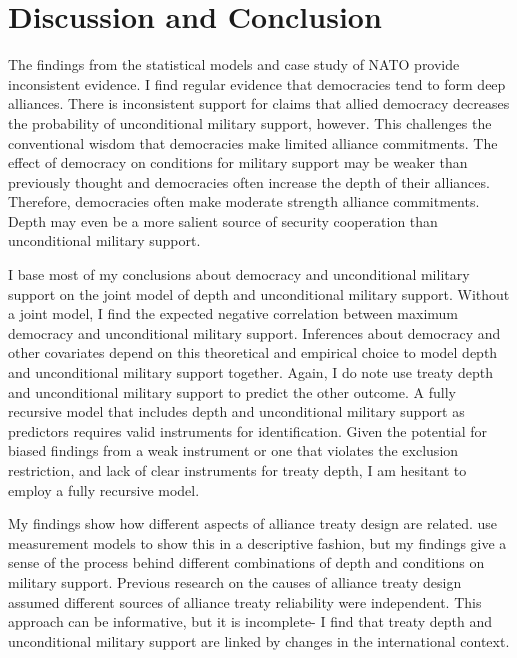 \documentclass[12pt]{article}
\begin{document}
\section{Discussion and Conclusion}


The findings from the statistical models and case study of NATO provide inconsistent evidence. 
I find regular evidence that democracies tend to form deep alliances.
There is inconsistent support for claims that allied democracy decreases the probability of unconditional military support, however. 
This challenges the conventional wisdom that democracies make limited alliance commitments.
The effect of democracy on conditions for military support may be weaker than previously thought and democracies often increase the depth of their alliances. 
Therefore, democracies often make moderate strength alliance commitments. 
Depth may even be a more salient source of security cooperation than unconditional military support. 


I base most of my conclusions about democracy and unconditional military support on the joint model of depth and unconditional military support.
Without a joint model, I find the expected negative correlation between maximum democracy and unconditional military support.  
Inferences about democracy and other covariates depend on this theoretical and empirical choice to model depth and unconditional military support together. 
Again, I do note use treaty depth and unconditional military support to predict the other outcome. 
A fully recursive model that includes depth and unconditional military support as predictors requires valid instruments for identification.
Given the potential for biased findings from a weak instrument or one that violates the exclusion restriction, and lack of clear instruments for treaty depth, I am hesitant to employ a fully recursive model.  


My findings show how different aspects of alliance treaty design are related. 
\citet{BensonClinton2016} use measurement models to show this in a descriptive fashion, but my findings give a sense of the process behind different combinations of depth and conditions on military support. 
Previous research on the causes of alliance treaty design \citep{Benson2012, Mattes2012, Chibaetal2015} assumed different sources of alliance treaty reliability were independent. 
This approach can be informative, but it is incomplete- I find that treaty depth and unconditional military support are linked by changes in the international context. 
\end{document}
